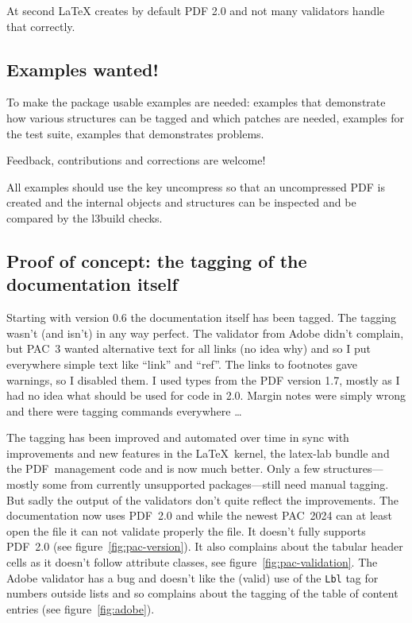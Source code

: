 \documentclass[bibliography=totoc,a4paper]{article}
\newcommand\PrintKeyName[1]{\textsf{#1}}
\newcommand\PDF{PDF}
\begin{document}
At second \LaTeX{} creates by default PDF 2.0 and not many validators handle that correctly. 
 

\subsection{Examples wanted!}

To make the package usable examples are needed: examples that demonstrate how 
various structures can be tagged and which patches are needed, examples for 
the test suite, examples that demonstrates problems. 


\begin{tcolorbox}
Feedback, contributions and corrections are welcome!
\end{tcolorbox}


All examples should use the  key \PrintKeyName{uncompress}
so that an uncompressed \PDF{} is created and the internal objects and 
structures can be inspected and be compared by the l3build checks.%



\subsection{Proof of concept: the tagging of the documentation itself}

Starting with version 0.6 the documentation itself has been tagged. The 
tagging wasn't (and isn't) in any way perfect. The validator from Adobe didn't 
complain, but PAC~3 wanted alternative text for all links (no idea why) and 
so I put everywhere simple text like \enquote{link} and \enquote{ref}. The 
links to footnotes gave warnings, so I disabled them. I used types from the 
\PDF{} version 1.7, mostly as I had no idea what should be used for code in 
2.0. Margin notes were simply wrong and there were tagging commands 
everywhere \ldots 

The tagging has been improved and automated over time in sync with 
improvements and new features in the \LaTeX\ kernel, the latex-lab bundle and 
the \PDF\ management code and is now much better. Only a few 
structures---mostly some from currently unsupported packages---still need 
manual tagging. But sadly the output of the validators don't quite reflect 
the improvements. The documentation now uses \PDF~2.0  and while the newest 
PAC~2024 can at least open the file it can not validate properly the file.
It doesn't fully supports \PDF~2.0 (see figure~\ref{fig:pac-version}). It also
complains about the tabular header cells as it doesn't follow attribute classes, see
figure~\ref{fig:pac-validation}.
The Adobe validator has a bug and 
doesn't like the (valid) use of  the \texttt{Lbl} tag for numbers outside lists and
so complains about the tagging of the table of content entries (see figure~\ref{fig:adobe}).  
\end{document}

